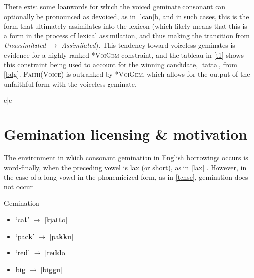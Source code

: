 \documentclass{article}
\begin{document}
There exist some loanwords for which the voiced geminate consonant can optionally be pronounced as devoiced, as in \ref{loan}b, and in such cases, this is the form that ultimately assimilates into the lexicon (which likely means that this is a form in the process of lexical assimilation, and thus making the transition from \textit{Unassimilated} $\rightarrow$ \textit{Assimilated}). This tendency toward voiceless geminates is evidence for a highly ranked \textsc{*VoiGem} constraint, and the tableau in \ref{t1} shows this constraint being used to account for the winning candidate, [tatta], from \ref{bdg}. \textsc{Faith(Voice)} is outranked by \textsc{*VoiGem}, which allows for the output of the unfaithful form with the voiceless geminate.

\vspace{.25cm}

\begin{exe}
\ex
\label{t1}
\begin{tableau}{c|c}
  
             \vio{*!}   \vio{}            
    \vio{}    \vio{*}          
\end{tableau}
\end{exe}

\vspace{.25cm}

\section{Gemination licensing \& motivation}
\label{licensing}

The environment in which consonant gemination in English borrowings occurs is word-finally, when the preceding vowel is lax (or short), as in \ref{lax} \citep[p. 2]{Kawahara2015}. However, in the case of a long vowel in the phonemicized form, as in \ref{tense}, gemination does not occur \citep[p. 11]{Kubozono2009}.

\begin{exe}
    \ex
    Gemination
    \begin{itemize}
        \item [a] ‘ca\textbf{t}' $\rightarrow$ [kja\textbf{tt}o]
        \item [b] ‘pa\textbf{ck}' $\rightarrow$ [pa\textbf{kk}u]
        \item [c] ‘re\textbf{d}' $\rightarrow$ [re\textbf{dd}o]
        \item [d] bi\textbf{g} $\rightarrow$ [bi\textbf{gg}u]
    \end{itemize}
    \label{lax}
    
\end{exe}
\end{document}
